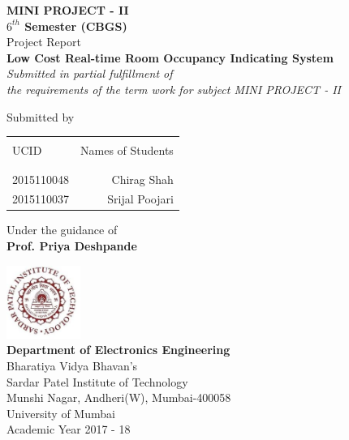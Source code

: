\begin{titlepage}

\begin{center}

\textup{\small {\bf MINI PROJECT - II\\  $6 ^{th}$ Semester (CBGS) } \\ Project Report}\\[0.2in]

\Large \textbf {Low Cost Real-time Room Occupancy Indicating System}\\[0.5in]

       \small \emph{Submitted in partial fulfillment of\\
        the requirements of the term work for subject MINI PROJECT - II}
        \vspace{1in}

     

\normalsize Submitted by \\
\begin{table}[h]
\centering
\begin{tabular}{lr}\hline \\
UCID & Names of Students \\ \\ \hline
\\
2015110048 &  Chirag Shah \\
2015110037 &  Srijal Poojari \\ 
 \hline 
\end{tabular}
\end{table}

\vspace{.1in}
Under the guidance of\\
{\textbf{Prof. Priya Deshpande}}\\[0.2in]

\vfill

\includegraphics[width=0.18\textwidth]{spit_logo.jpg}\\[0.1in]

\textbf {Department of Electronics Engineering}\\
Bharatiya  Vidya Bhavan's\\
Sardar Patel Institute of Technology\\
Munshi Nagar, Andheri(W), Mumbai-400058\\
University of Mumbai\\
Academic Year 2017 - 18\\


\end{center}

\end{titlepage}

